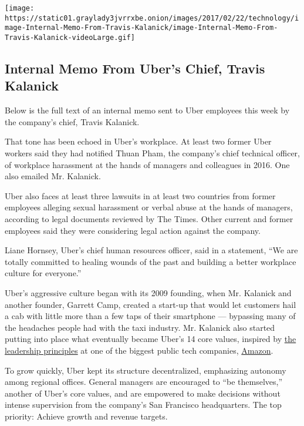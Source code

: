 \href{https://www.nytimes3xbfgragh.onion/interactive/2017/02/22/technology/document-Internal-Memo-From-Travis-Kalanick.html}{}

\texttt{[image: https://static01.graylady3jvrrxbe.onion/images/2017/02/22/technology/image-Internal-Memo-From-Travis-Kalanick/image-Internal-Memo-From-Travis-Kalanick-videoLarge.gif]}

\hypertarget{internal-memo-from-ubers-chief-travis-kalanick}{%
\subsection{Internal Memo From Uber's Chief, Travis
Kalanick}\label{internal-memo-from-ubers-chief-travis-kalanick}}

Below is the full text of an internal memo sent to Uber employees this
week by the company's chief, Travis Kalanick.

That tone has been echoed in Uber's workplace. At least two former Uber
workers said they had notified Thuan Pham, the company's chief technical
officer, of workplace harassment at the hands of managers and colleagues
in 2016. One also emailed Mr. Kalanick.

Uber also faces at least three lawsuits in at least two countries from
former employees alleging sexual harassment or verbal abuse at the hands
of managers, according to legal documents reviewed by The Times. Other
current and former employees said they were considering legal action
against the company.

Liane Hornsey, Uber's chief human resources officer, said in a
statement, ``We are totally committed to healing wounds of the past and
building a better workplace culture for everyone.''

Uber's aggressive culture began with its 2009 founding, when Mr.
Kalanick and another founder, Garrett Camp, created a start-up that
would let customers hail a cab with little more than a few taps of their
smartphone --- bypassing many of the headaches people had with the taxi
industry. Mr. Kalanick also started putting into place what eventually
became Uber's 14 core values, inspired by
\href{https://www.amazon.jobs/principles}{the leadership principles} at
one of the biggest public tech companies,
\href{https://www.nytimes3xbfgragh.onion/2015/08/16/technology/inside-amazon-wrestling-big-ideas-in-a-bruising-workplace.html}{Amazon}.

To grow quickly, Uber kept its structure decentralized, emphasizing
autonomy among regional offices. General managers are encouraged to ``be
themselves,'' another of Uber's core values, and are empowered to make
decisions without intense supervision from the company's San Francisco
headquarters. The top priority: Achieve growth and revenue targets.

